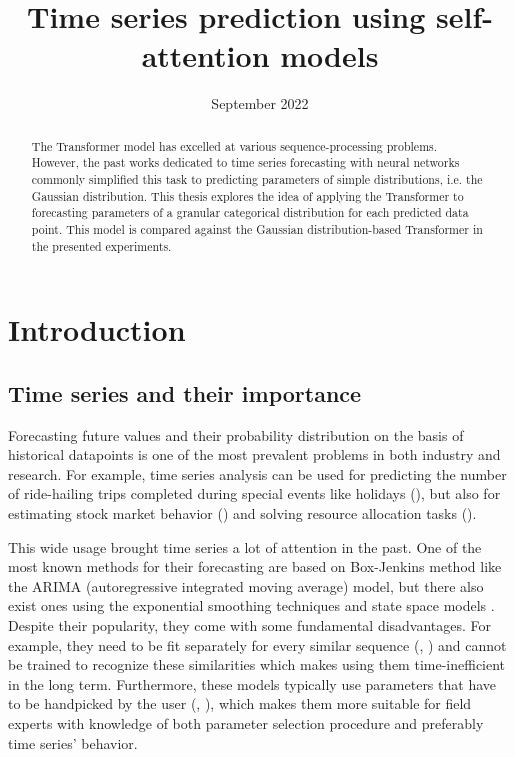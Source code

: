 \documentclass[en]{pracamgr}
\title{Time series prediction using self-attention models}
\date{September 2022}
\begin{document}
\maketitle

\begin{abstract}
The Transformer model has excelled at various sequence-processing problems. However, the past works dedicated to time series forecasting with neural networks commonly simplified this task to predicting parameters of simple distributions, i.e. the Gaussian distribution. This thesis explores the idea of applying the Transformer to forecasting parameters of a granular categorical distribution for each predicted data point. This model is compared against the Gaussian distribution-based Transformer in the presented experiments.

\end{abstract}

\tableofcontents

\chapter*{Introduction}

\section*{Time series and their importance}\label{r:tsi}

Forecasting future values and their probability distribution on the basis of historical datapoints is one of the most prevalent problems in both industry and research.
For example, time series analysis can be used for predicting the number of ride-hailing trips completed during special events like holidays (\cite{uber}), but also for estimating stock market behavior (\cite{stock1}) and solving resource allocation tasks (\cite{graph-forecast}). 

This wide usage brought time series a lot of attention in the past. One of the most known methods for their forecasting are based on Box-Jenkins method like the ARIMA (autoregressive integrated moving average) \cite{arima} model, but there also exist ones using the exponential smoothing techniques and state space models \cite{ssm}. Despite their popularity, they come with some fundamental disadvantages. For example, they need to be fit separately for every similar sequence (\cite{enhancing}, \cite{deepar}) and cannot be trained to recognize these similarities which makes using them time-inefficient in the long term.
Furthermore, these models typically use parameters that have to be handpicked by the user (\cite{enhancing},
\cite{deepar}), which makes them more suitable for field experts with knowledge of both parameter selection procedure and preferably time series' behavior.
\end{document}
